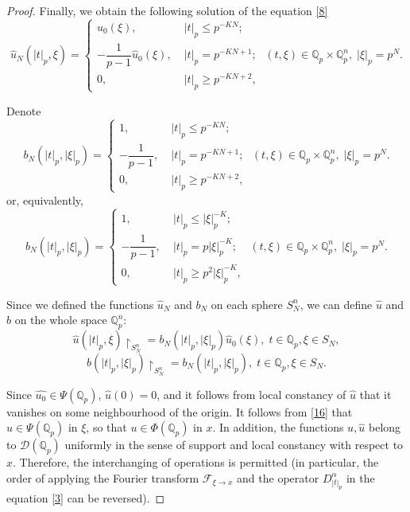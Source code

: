 \documentclass[14pt]{article}
\theoremstyle{theorem}
\theoremstyle{theorem}
\theoremstyle{definition}
\theoremstyle{lemma}
\newcommand{\Label}[1]{\label{#1}}
\numberwithin{equation}{section}
\begin{document}
\begin{proof}
Finally, we obtain the following solution of the equation \eqref{8}
\begin{equation}\Label{14}
\hat{u}_N(|t|_p,\xi)=
\left\{
\begin{array}{ll}
\hat{u}_0(\xi),\;&|t|_p\leq p^{-KN};\\
-\dfrac{1}{p-1}\hat{u}_0(\xi),\;&|t|_p=p^{-KN+1};\\
0,\;&|t|_p\geq p^{-KN+2},
\end{array}
\right.\;(t,\xi)\in\mathbb{Q}_p\times\mathbb{Q}_p^n,\;|\xi|_p=p^N.
\end{equation}

Denote
\begin{equation}\Label{15}
b_N(|t|_p,|\xi|_p)=
\left\{
\begin{array}{ll}
1,\;&|t|_p\leq p^{-KN};\\
-\dfrac{1}{p-1},\;&|t|_p=p^{-KN+1};\\
0,\;&|t|_p\geq p^{-KN+2},
\end{array}
\right.\;(t,\xi)\in\mathbb{Q}_p\times\mathbb{Q}_p^n,\;|\xi|_p=p^N.
\end{equation}
or, equivalently,
\begin{equation}\Label{15.5}
b_N(|t|_p,|\xi|_p)=
\left\{
\begin{array}{ll}
1,\;&|t|_p\leq |\xi|_p^{-K};\\
-\dfrac{1}{p-1},\;&|t|_p=p|\xi|_p^{-K};\\
0,\;&|t|_p\geq p^{2}|\xi|_p^{-K},
\end{array}
\right.\;(t,\xi)\in\mathbb{Q}_p\times\mathbb{Q}_p^n,\;|\xi|_p=p^N.
\end{equation}

Since we defined the functions $\widehat{u}_N$ and $b_N$ on each sphere $S_N^n$, we can define $\hat{u}$ and $b$ on the whole space $\mathbb{Q}_p^n$:
\begin{equation}\Label{16}
\hat{u}(|t|_p,\xi)\restriction_{S_N^n}=b_N(|t|_p,|\xi|_p)\hat{u}_0(\xi),\;t\in\mathbb{Q}_p,\xi\in S_N,
\end{equation}
\begin{equation}\Label{16.5}
b(|t|_p,|\xi|_p)\restriction_{S_N^n}=b_N(|t|_p,|\xi|_p),\;t\in\mathbb{Q}_p,\xi\in S_N.
\end{equation}

Since $\hat{u_0}\in\Psi(\mathbb{Q}_p)$, $\hat{u}(0)=0$, and it follows from local constancy of $\hat{u}$ that it vanishes on some neighbourhood of the origin. It follows from \eqref{16} that $\hat{u}\in\Psi(\mathbb{Q}_p)$ in $\xi$, so that $u\in\Phi(\mathbb{Q}_p)$ in $x$. In addition, the functions $u,\hat{u}$ belong to $\mathcal{D}(\mathbb{Q}_p)$ uniformly in the sense of support and local constancy with respect to $x$. Therefore, the interchanging of operations is permitted (in particular, the order of applying the Fourier transform $\mathcal{F}_{\xi\to x}$ and the operator $D_{|t|_p}^{\alpha}$ in the equation \eqref{3} can be reversed).


\end{proof}
\end{document}
